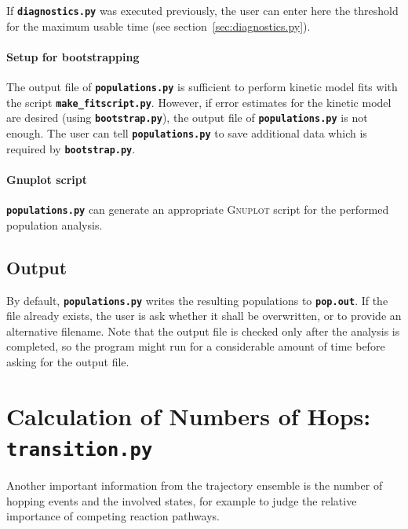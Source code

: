 \documentclass[a4paper,10pt,DIV=15,openany]{scrbook}
\newcommand{\ttt}[1]{\textbf{\texttt{#1}}}
\begin{document}
If \ttt{diagnostics.py} was executed previously, the user can enter here the threshold for the maximum usable time (see section~\ref{sec:diagnostics.py}).

\paragraph{Setup for bootstrapping}

The output file of \ttt{populations.py} is sufficient to perform kinetic model fits with the script \ttt{make\_fitscript.py}.
However, if error estimates for the kinetic model are desired (using \ttt{bootstrap.py}), the output file of \ttt{populations.py} is not enough.
The user can tell \ttt{populations.py} to save additional data which is required by \ttt{bootstrap.py}.

\paragraph{Gnuplot script}

\ttt{populations.py} can generate an appropriate \textsc{Gnuplot} script for the performed population analysis. 

\subsection{Output}

By default, \ttt{populations.py} writes the resulting populations to \ttt{pop.out}. If the file already exists, the user is ask whether it shall be overwritten, or to provide an alternative filename. Note that the output file is checked only after the analysis is completed, so the program might run for a considerable amount of time before asking for the output file.








\section{Calculation of Numbers of Hops: \ttt{transition.py}}\label{sec:transition.py}

Another important information from the trajectory ensemble is the number of hopping events and the involved states, for example to judge the relative importance of competing reaction pathways.
\end{document}

